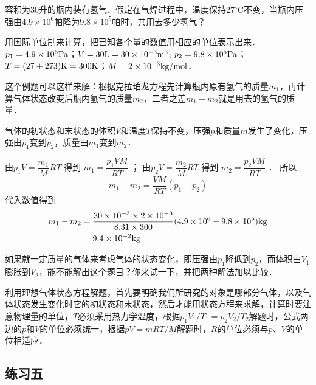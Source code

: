 \begin{example}
容积为30升的瓶内装有氢气．假定在气焊过程中，温度保持27$^\circ$C不变，当瓶内压强由$4. 9\times 10^6$帕降为$9.8\times 10^5$帕时，共用去多少氢气？
\end{example}

\begin{solution}
用国际单位制来计算，把已知各个量的数值用相应的单位表示出来．
$p_1=4.9\times 10^6{\rm Pa}$；$V=30{\rm L}=30\times 10^{-3}{\rm m^3}$; $p_2=9.8\times 10^5{\rm Pa}$；$T=(27+273){\rm K}=300{\rm K}$；$M=2\times 10^{-3}{\rm kg}/{\rm mol}$．

这个例题可以这样来解：根据克拉珀龙方程先计算瓶内原有氢气的质量$m_1$，再计算气体状态改变后瓶内氢气的质量$m_2$，二者之差$m_1-m_2$就是用去的氢气的质量．

气体的初状态和末状态的体积$V$和温度$T$保持不变，压强$p$和质量$m$发生了变化，压强由$p_1$变到$p_2$，质量由$m_1$变到$m_2$．

由$p_1V=\dfrac{m_1}{M}RT$ 得到 $m_1=\dfrac{p_1VM}{RT}$
；
由$p_2V=\dfrac{m_2}{M}RT$ 得到 $m_2=\dfrac{p_2VM}{RT}$
．
所以
\[m_1-m_2=\frac{VM}{RT}(p_1-p_2) \]
代入数值得到
\[\begin{split}
m_1-m_2&=\frac{30\times 10^{-3}\times 2\times 10^{-3}}{8.31\times 300}(4.9\times 10^6-9.8\times 10^5){\rm kg}\\
    &=9.4\times 10^{-2}{\rm kg}
\end{split} \]
\end{solution}

如果就一定质量的气体来考虑气体的状态变化，即压强由$p_1$降低到$p_2$，而体积由$V_1$膨胀到$V_2$，能不能解出这个题目？你来试一下，并把两种解法加以比较．

利用理想气体状态方程解题，首先要明确我们所研究的对象是哪部分气体，以及气体状态发生变化时它的初状态和末状态，然后才能用状态方程来求解，计算时要注意物理量的单位，$T$必须采用热力学温度，根据$p_1V_1/T_1=p_2V_2/T_2$解题时，公式两边的$p$和$V$的单位必须统一，根据$pV=mRT/M$解题时，$R$的单位必须与$p$、$V$的单位相适应．

\subsection*{练习五}

